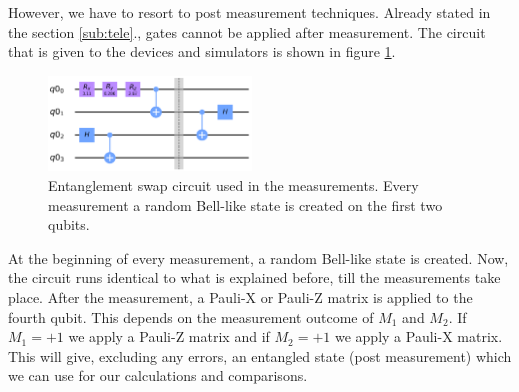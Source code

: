 However, we have to resort to post measurement techniques. Already stated in the section \ref{sub:tele}., gates cannot be applied after measurement. The circuit that is given to the devices and simulators is shown in figure \ref{fig:swapcir}.
\begin{figure}[h]
	\includegraphics[width=0.48\textwidth]{images/swap_circuit.png}
	\caption{Entanglement swap circuit used in the measurements. Every measurement a random Bell-like state is created on the first two qubits.}
	\label{fig:swapcir}
\end{figure}
At the beginning of every measurement, a random Bell-like state is created. Now, the circuit runs identical to what is explained before, till the measurements take place. After the measurement, a Pauli-X or Pauli-Z matrix is applied to the fourth qubit. This depends on the measurement outcome of $M_1$ and $M_2$. If $M_1 = +1$ we apply a Pauli-Z matrix and if $M_2 = +1$ we apply a Pauli-X matrix. This will give, excluding any errors, an entangled state (post measurement) which we can use for our calculations and comparisons.

